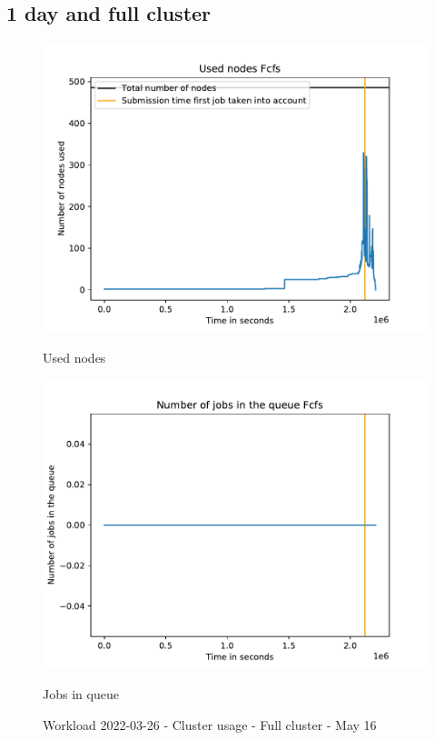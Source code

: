 \documentclass[a4paper]{article}
\begin{document}
	\subsection{1 day and full cluster}
	\begin{figure}[H]\begin{minipage}[b]{0.5\linewidth}\centering\includegraphics[width=1\linewidth]{MBSS/plot/2022-03-26->2022-03-26_Fcfs_Used_nodes_450_128_32_256_4_1024.pdf}\caption{Used nodes}\vspace{4ex}\end{minipage}%
	\begin{minipage}[b]{0.5\linewidth}\centering\includegraphics[width=1\linewidth]{MBSS/plot/2022-03-26->2022-03-26_Fcfs_Nb_scheduled_jobs_450_128_32_256_4_1024.pdf}\caption{Jobs in queue}\vspace{4ex}\end{minipage}\caption{Workload 2022-03-26 - Cluster usage - Full cluster - May 16}\end{figure}
	
\end{document}
